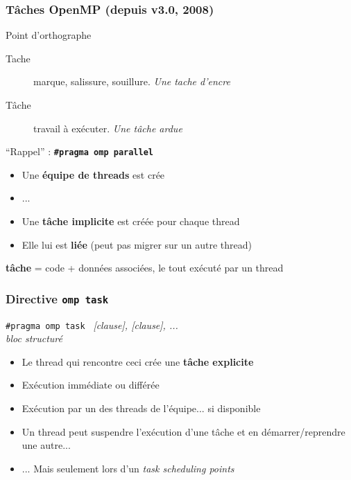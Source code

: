 \documentclass{beamer}
\begin{document}
\begin{frame}
  \frametitle{Tâches OpenMP (depuis v3.0, 2008)}

  \begin{alertblock}{Point d'orthographe}
  \begin{description}
    \item[Tache] marque, salissure, souillure. \textit{Une tache d'encre}
    \item[Tâche] travail à exécuter. \textit{Une tâche ardue}
    \end{description}
  \end{alertblock}

  \pause
  
  \begin{block}{``Rappel'' : \bf \texttt{\#pragma omp parallel}}
    \begin{itemize}
    \item Une \alert{\textbf{équipe de threads}} est crée
    \item ...
    \item Une \alert{\textbf{tâche implicite}} est créée pour chaque thread
    \item Elle lui est \textbf{liée} (peut pas migrer sur un autre thread)
    \end{itemize}
  \end{block}
  
  \medskip
  
  \textbf{tâche} = code + données associées, le tout exécuté par un thread
\end{frame}


\begin{frame}
  \frametitle{Directive \texttt{omp task}}

  \begin{framed}
  {\tt \#pragma omp task } {\it [clause], [clause], ...}  \\
  {\it bloc structuré} 
\end{framed}

\begin{itemize}
\item Le thread qui rencontre ceci crée une \textbf{tâche explicite}
\item Exécution \alert{immédiate} ou \alert{différée}
\item Exécution par un des threads de l'équipe... si disponible
\pause
\item Un thread peut suspendre l'exécution d'une tâche et en démarrer/reprendre
  une autre...
  \item ... Mais seulement lors d'un \emph{task scheduling points}
\end{itemize}
\end{frame}
\end{document}
